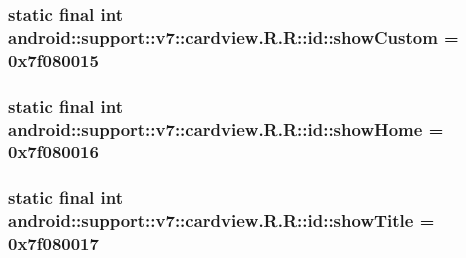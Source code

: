 \hypertarget{classandroid_1_1support_1_1v7_1_1cardview_1_1_r_1_1id_0d71db6707b7f320bab77c69785883e5}{
\subsubsection[{showCustom}]{\setlength{\rightskip}{0pt plus 5cm}static final int android::support::v7::cardview.R.R::id::showCustom = 0x7f080015}}
\label{classandroid_1_1support_1_1v7_1_1cardview_1_1_r_1_1id_0d71db6707b7f320bab77c69785883e5}


\hypertarget{classandroid_1_1support_1_1v7_1_1cardview_1_1_r_1_1id_dc2040fa82d2d468aaee09e4f908f1e7}{
\subsubsection[{showHome}]{\setlength{\rightskip}{0pt plus 5cm}static final int android::support::v7::cardview.R.R::id::showHome = 0x7f080016}}
\label{classandroid_1_1support_1_1v7_1_1cardview_1_1_r_1_1id_dc2040fa82d2d468aaee09e4f908f1e7}


\hypertarget{classandroid_1_1support_1_1v7_1_1cardview_1_1_r_1_1id_bc88171058a1beee6f1ff9136ebfd096}{
\subsubsection[{showTitle}]{\setlength{\rightskip}{0pt plus 5cm}static final int android::support::v7::cardview.R.R::id::showTitle = 0x7f080017}}
\label{classandroid_1_1support_1_1v7_1_1cardview_1_1_r_1_1id_bc88171058a1beee6f1ff9136ebfd096}


